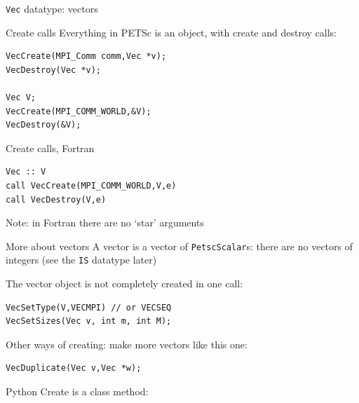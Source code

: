 
 {\texttt{Vec} datatype: vectors}


\begin{numberedframe}{Create calls}
\small
Everything in PETSc is an object, with create and destroy calls:
\begin{lstlisting}
VecCreate(MPI_Comm comm,Vec *v);
VecDestroy(Vec *v);

Vec V;
VecCreate(MPI_COMM_WORLD,&V);
VecDestroy(&V);
\end{lstlisting}
\end{numberedframe}

\begin{longstory}

\begin{details}
\lstset{language=Fortran}
\begin{fortran}
\begin{numberedframe}{Create calls, Fortran}
\begin{lstlisting}
Vec :: V
call VecCreate(MPI_COMM_WORLD,V,e)
call VecDestroy(V,e)
\end{lstlisting}
Note: in Fortran there are no `star' arguments
\end{numberedframe}
\end{fortran}
\lstset{language=C}

\begin{numberedframe}{More about vectors}
A vector is a vector of \lstinline{PetscScalar}s: there are no vectors of
integers (see the \lstinline{IS} datatype later)

The vector object is not completely created in one call:
\begin{lstlisting}
VecSetType(V,VECMPI) // or VECSEQ
VecSetSizes(Vec v, int m, int M);
\end{lstlisting}
Other ways of creating: make more vectors like this one:
\begin{lstlisting}
VecDuplicate(Vec v,Vec *w);
\end{lstlisting}
\end{numberedframe}

\end{details}

\lstset{language=Python}  
\begin{python}
\begin{numberedframe}{Python}
  Create is a class method:

\end{numberedframe}
\end{python}
\lstset{language=C}

\end{longstory}

